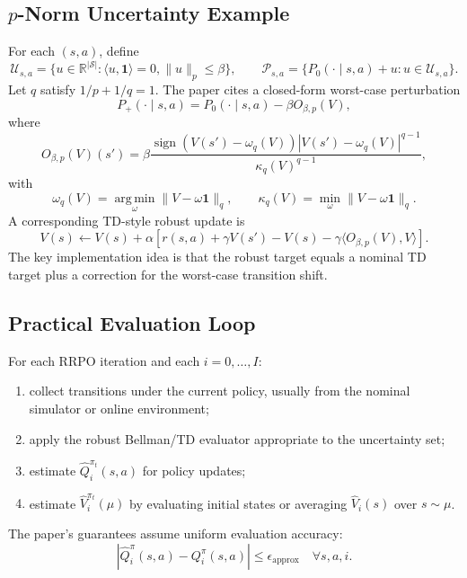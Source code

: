 \documentclass[11pt]{article}
\newcommand{\Sset}{\mathcal S}
\newcommand{\Pset}{\mathcal P}
\newcommand{\R}{\mathbb R}
\newcommand{\argmin}{\operatorname*{arg\,min}}
\newcommand{\1}{\mathbf 1}
\newcommand{\epsapp}{\epsilon_{\mathrm{approx}}}
\begin{document}
\subsection{$p$-Norm Uncertainty Example}
For each $(s,a)$, define
\begin{equation}
    \mathcal U_{s,a}=\{u\in\R^{|\Sset|}:\langle u,\1\rangle=0,\|u\|_p\le\beta\},
    \qquad
    \Pset_{s,a}=\{P_0(\cdot\mid s,a)+u:u\in\mathcal U_{s,a}\}.
\end{equation}
Let $q$ satisfy $1/p+1/q=1$.  The paper cites a closed-form worst-case perturbation
\begin{equation}
    P_+(\cdot\mid s,a)=P_0(\cdot\mid s,a)-\beta O_{\beta,p}(V),
\end{equation}
where
\begin{equation}
    O_{\beta,p}(V)(s')
    =\beta\frac{\operatorname{sign}(V(s')-\omega_q(V))|V(s')-\omega_q(V)|^{q-1}}{\kappa_q(V)^{q-1}},
\end{equation}
with
\begin{equation}
    \omega_q(V)=\argmin_\omega\|V-\omega\1\|_q,
    \qquad
    \kappa_q(V)=\min_\omega\|V-\omega\1\|_q.
\end{equation}
A corresponding TD-style robust update is
\begin{equation}
    V(s)\leftarrow V(s)+\alpha\left[r(s,a)+\gamma V(s')-V(s)-\gamma\langle O_{\beta,p}(V),V\rangle\right].
    \label{eq:pnorm-td}
\end{equation}
The key implementation idea is that the robust target equals a nominal TD target plus a correction for the worst-case transition shift.

\subsection{Practical Evaluation Loop}
For each RRPO iteration and each $i=0,\ldots,I$:
\begin{enumerate}[leftmargin=2em]
    \item collect transitions under the current policy, usually from the nominal simulator or online environment;
    \item apply the robust Bellman/TD evaluator appropriate to the uncertainty set;
    \item estimate $\widehat Q_i^{\pi_t}(s,a)$ for policy updates;
    \item estimate $\widehat V_i^{\pi_t}(\mu)$ by evaluating initial states or averaging $\widehat V_i(s)$ over $s\sim\mu$.
\end{enumerate}
The paper's guarantees assume uniform evaluation accuracy:
\begin{equation}
    |\widehat Q_i^\pi(s,a)-Q_i^\pi(s,a)|\le\epsapp
    \quad\forall s,a,i.
    \label{eq:q-accuracy}
\end{equation}
\end{document}
